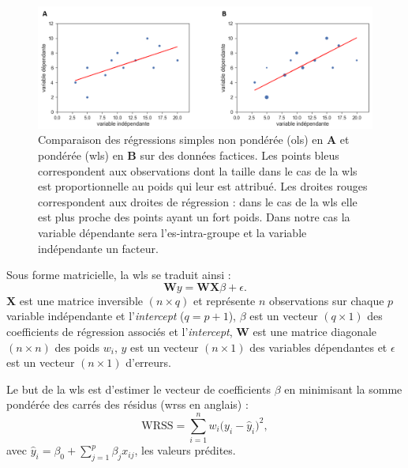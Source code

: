 \begin{figure}[h!]
  \centering
	\includegraphics[width=1.0\linewidth]{figures/chapter-3/factors-comparison-ols-wls} 
  \caption{Comparaison des régressions simples non pondérée (\gls{ols}) en \textbf{A} et pondérée (\gls{wls}) en \textbf{B} sur des données factices. Les points bleus correspondent aux observations
	dont la taille dans le cas de la \gls{wls} est proportionnelle au poids qui leur est attribué. Les droites rouges correspondent aux droites de régression : dans le cas de la \gls{wls} elle
	est plus proche des points ayant un fort poids. Dans notre cas la variable dépendante sera l'\gls{es}-intra-groupe et la variable indépendante un facteur.}
  \label{Figure:factors_comparison_ols_wls}
\end{figure}

Sous forme matricielle, la \gls{wls} se traduit ainsi : 
\begin{equation}
\label{eq:factors_model_WLS}
\textbf{W}y = \textbf{WX}\beta + \epsilon.
\end{equation}
$\textbf{X}$ est une matrice inversible $(n \times q)$ et représente $n$ observations sur chaque $p$ variable indépendante et l'\textit{intercept}  
($q = p + 1$), 
$\beta$ est un vecteur $(q \times 1)$ des coefficients de régression associés et l'\textit{intercept}, $\textbf{W}$ est une matrice diagonale $(n \times n)$  
des poids $w_{i}$, $y$ est un vecteur $(n \times 1)$ des variables dépendantes et $\epsilon$ est un vecteur $(n \times 1)$ d'erreurs.

Le but de la \gls{wls} est d'estimer le vecteur de coefficients $\beta$ en minimisant la somme pondérée des carrés des résidus (\gls{wrss} en anglais) :
\begin{equation}
\label{eq:factors_WRSS}
\text{WRSS} = \sum_{i=1}^{n} w_i \Big(y_i - \hat{y}_i\Big)^2, 
\end{equation}
avec $\hat{y}_i = \beta_{0} + \sum_{j=1}^{p}\beta_{j}x_{ij}$, les valeurs prédites.

